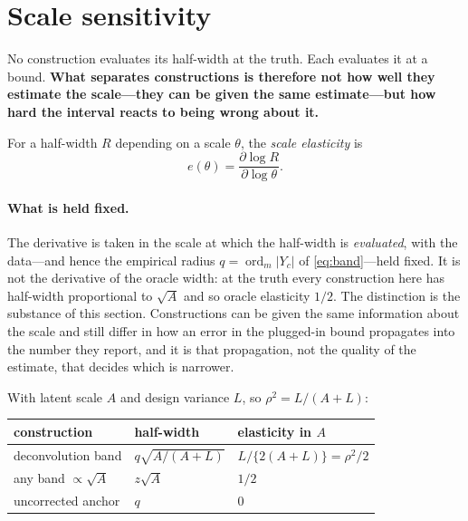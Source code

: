 \section{Scale sensitivity}\label{sec:sensitivity}

No construction evaluates its half-width at the truth. Each evaluates it at a
bound. \textbf{What separates constructions is therefore not how well they
estimate the scale---they can be given the same estimate---but how hard the
interval reacts to being wrong about it.}

\begin{definition}
For a half-width $R$ depending on a scale $\theta$, the \emph{scale elasticity}
is
\[
e(\theta)=\frac{\partial\log R}{\partial\log\theta}.
\]
\end{definition}

\paragraph{What is held fixed.} The derivative is taken in the scale at which
the half-width is \emph{evaluated}, with the data---and hence the empirical
radius $q=\operatorname{ord}_m|Y_c|$ of \eqref{eq:band}---held fixed. It is not
the derivative of the oracle width: at the truth every construction here has
half-width proportional to $\sqrt A$ and so oracle elasticity $1/2$. The
distinction is the substance of this section. Constructions can be given the same
information about the scale and still differ in how an error in the plugged-in
bound propagates into the number they report, and it is that propagation, not the
quality of the estimate, that decides which is narrower.

With latent scale $A$ and design variance $L$, so $\rho^2=L/(A+L)$:

\begin{center}
\begin{singlespace}
\small
\begin{tabular}{lll}
\toprule
construction & half-width & elasticity in $A$\\
\midrule
deconvolution band & $q\sqrt{A/(A+L)}$ & $L/\{2(A+L)\}=\rho^2/2$\\
any band $\propto\sqrt A$ & $z\sqrt A$ & $1/2$\\
uncorrected anchor & $q$ & $0$\\
\bottomrule
\end{tabular}
\end{singlespace}
\end{center}

